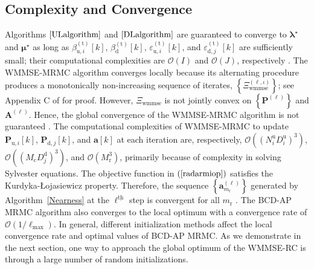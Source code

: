 \documentclass[10pt,journal]{IEEEtran}
\newcommand{\paren}[1]{\left({#1}\right)}
\newcommand{\bracket}[1]{{\left [{#1}\right ]}}
\newcommand{\braces}[1]{{\left\{ {#1}\right\}}}
\newcommand{\ith}[1]    {{#1}^{\underline{\text{th}}}}
\newcommand{\rr}{_\mathrm{r}}
\newcommand{\PiB}{\mathbf{P}_{\textrm{u},i}\bracket{k}}
\newcommand{\PBj}{\mathbf{P}_{\textrm{d},j}\bracket{k}}
\newcommand{\sfrac}[2]{#1/#2}
\theoremstyle{definition}
\begin{document}
\subsection{Complexity and Convergence}
Algorithms $\ref{ULalgorithm}$ and $\ref{DLalgorithm}$ are guaranteed to converge to $\boldsymbol{\lambda}^\star$ and $\boldsymbol{\mu}^\star$ as long as $\beta^{\paren{\mathrm{t}}}_{\textrm{u},i}\bracket{k}$, $\beta^{\paren{\mathrm{t}}}_{\textrm{d}}\bracket{k}$, $\varepsilon^{\paren{\mathrm{t}}}_{\textrm{u},i}\bracket{k}$, and $\varepsilon^{\paren{\mathrm{t}}}_{\textrm{d},j}\bracket{k}$ are sufficiently small; their computational complexities are $\mathcal{O}\paren{\mathit{I}}$ and $\mathcal{O}\paren{\mathit{J}}$, respectively \cite{Lui2006subg}. The WMMSE-MRMC algorithm converges locally because its alternating procedure produces a monotonically non-increasing sequence of iterates, $\braces{\Xi^{\paren{\ell,\iota}}_{\textrm{wmmse}}}$; see Appendix C of \cite{Luo2011IterativeWMMSE} for proof. However, $\Xi_{\textrm{wmmse}}$ is not jointly convex on $\braces{\mathbf{P}^{\paren{\ell}}}$ and $\mathbf{A}^{\paren{\ell}}$. Hence, the global convergence of the WMMSE-MRMC algorithm is not guaranteed \cite{Luo2011IterativeWMMSE,FD_WMMSE}. The computational complexities of WMMSE-MRMC to update $\PiB$, $\PBj$, and $\mathbf{a}\bracket{k}$ at each iteration are, respectively, $\mathcal{O}\paren{\paren{N^\textrm{u}_iD^\textrm{u}_{i}}^3}$, $\mathcal{O}\paren{\paren{M_{\textrm{c}}D^\textrm{d}_{j}}^3}$, and $\mathcal{O}\paren{M_{\textrm{r}}^3}$, primarily because of complexity in solving Sylvester equations. The objective function in $\paren{\ref{radarmiop}}$ satisfies the Kurdyka-\L ojasiewicz property. Therefore, the sequence $\braces{\mathbf{a}^{\paren{\ell}}_{m\rr}}$ generated by Algorithm~\ref{Nearness} at the $\ith{\ell}$ step is convergent for all $m\rr$ \cite{arXiv180203889Z}. The BCD-AP MRMC algorithm also converges to the local optimum with a convergence rate of $\mathcal{O}\paren{\sfrac{1}{\mathrm{\ell}_{\textrm{max}}}}$\cite{BCDconvergence}. 
In general, different initialization methods affect the local convergence rate and optimal values of BCD-AP MRMC. As we demonstrate in the next section, one way to approach the global optimum of the WMMSE-RC is through a large number of random initializations\cite{Luo2011IterativeWMMSE}.
\end{document}

